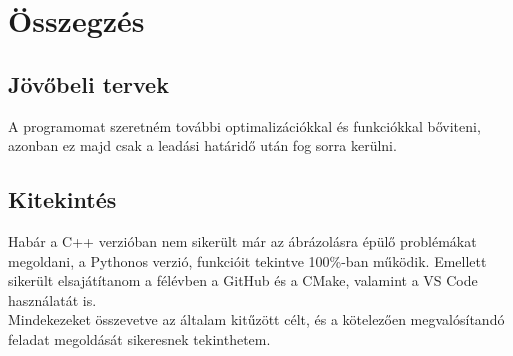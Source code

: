 \chapter{Összegzés}

\label{ch:osszegzes}

\section{Jövőbeli tervek}

A programomat szeretném további optimalizációkkal és funkciókkal bőviteni, azonban ez majd csak a leadási határidő után fog sorra kerülni. 

\section{Kitekintés}

Habár a C++ verzióban nem sikerült már az ábrázolásra épülő problémákat megoldani, a Pythonos verzió, funkcióit tekintve 100\%-ban működik. Emellett sikerült elsajátítanom a félévben a GitHub és a CMake, valamint a VS Code használatát is.\\
Mindekezeket összevetve az általam kitűzött célt, és a kötelezően megvalósítandó feladat megoldását sikeresnek tekinthetem.